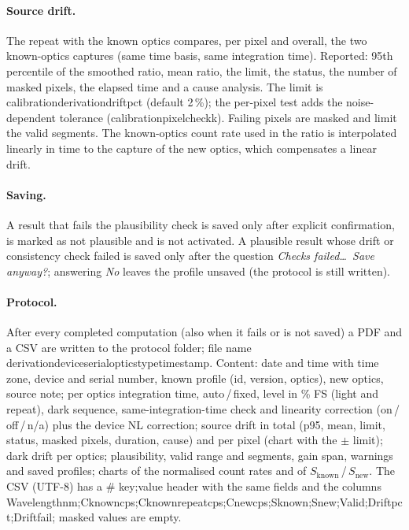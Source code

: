 \documentclass[12pt,a4paper]{article}
\DeclareRobustCommand{\code}[1]{{\ttfamily\small\def\_{\rawus\allowbreak}#1}}
\DeclareRobustCommand{\file}[1]{{\ttfamily\small\def\_{\rawus\allowbreak}#1}}
\DeclareRobustCommand{\key}[1]{{\ttfamily\small\color{acc2}\def\_{\rawus\allowbreak}#1}}
\begin{document}
\paragraph{Source drift.} The repeat with the known optics compares, per pixel
and overall, the two known-optics captures (same time basis, same integration
time). Reported: 95th percentile of the smoothed ratio, mean ratio, the limit, the
status, the number of masked pixels, the elapsed time and a cause analysis. The
limit is \key{calibration\_derivation\_drift\_pct} (default 2\,\%); the per-pixel
test adds the noise-dependent tolerance (\key{calibration\_pixel\_check\_k}).
Failing pixels are masked and limit the valid segments. The known-optics count
rate used in the ratio is interpolated linearly in time to the capture of the
new optics, which compensates a linear drift.

\paragraph{Saving.} A result that fails the plausibility check is saved only after
explicit confirmation, is marked as not plausible and is not activated. A
plausible result whose drift or consistency check failed is saved only after the
question \emph{Checks failed\ldots\ Save anyway?}; answering \emph{No} leaves
the profile unsaved (the protocol is still written).

\paragraph{Protocol.} After every completed computation (also when it fails or is
not saved) a PDF and a CSV are written to the protocol folder; file name
\file{derivation\_device\_serial\_optics\_type\_timestamp}. Content: date and time
with time zone, device and serial number, known profile (id, version, optics), new
optics, source note; per optics integration time, auto\,/\,fixed, level in
\% FS (light and repeat), dark sequence, same-integration-time check and
linearity correction (on\,/\,off\,/\,n/a) plus the device NL correction; source
drift in total (p95, mean, limit, status, masked pixels, duration, cause) and per
pixel (chart with the $\pm$ limit); dark drift per optics; plausibility, valid
range and segments, gain span, warnings and saved profiles; charts of the
normalised count rates and of $S_{\mathrm{known}}$\,/\,$S_{\mathrm{new}}$. The
CSV (UTF-8) has a \code{\# key;value} header with the same fields and the columns
\code{Wavelength\_nm;C\_known\_cps;C\_known\_repeat\_cps;C\_new\_cps;S\_known;S\_new;Valid;Drift\_pct;Drift\_fail};
masked values are empty.
\end{document}
